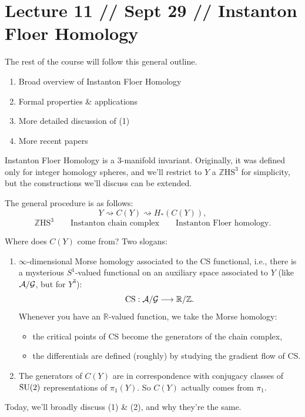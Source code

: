 \documentclass[main]{subfiles}
\begin{document}
\section*{Lecture 11 // Sept 29 // Instanton Floer Homology}

The rest of the course will follow this general outline.
\begin{enumerate}
\item Broad overview of Instanton Floer Homology
\item Formal properties \& applications
\item More detailed discussion of (1)
\item More recent papers
\end{enumerate}

Instanton Floer Homology is a $3$-manifold invariant. Originally, it was defined only for integer homology spheres, and we'll restrict to $Y$ a $\mathbb{Z}\mathrm{HS}^3$ for simplicity, but the constructions we'll discuss can be extended.

The general procedure is as follows:
\[
Y \rightsquigarrow C(Y) \rightsquigarrow H_\ast(C(Y)),
\]
\[
\mathbb{Z}\mathrm{HS}^3 \qquad \text{Instanton chain complex} \qquad \text{Instanton Floer homology}.
\]

Where does $C(Y)$ come from? Two slogans:
\begin{enumerate}
\item $\infty$-dimensional Morse homology associated to the CS functional, i.e., there is a mysterious $S^1$-valued functional on an auxiliary space associated to $Y$ (like $\mathcal{A}/\mathcal{G}$, but for $Y^3$):
\[
\operatorname{CS} : \mathcal{A}/\mathcal{G} \longrightarrow \mathbb{R}/\mathbb{Z}.
\]
Whenever you have an $\mathbb{R}$-valued function, we take the Morse homology:
\begin{itemize}
\item the critical points of CS become the generators of the chain complex,
\item the differentials are defined (roughly) by studying the gradient flow of CS.
\end{itemize}
\item The generators of $C(Y)$ are in correspondence with conjugacy classes of $\operatorname{SU}(2)$ representations of $\pi_1(Y)$. So $C(Y)$ actually comes from $\pi_1$.
\end{enumerate}

Today, we'll broadly discuss (1) \& (2), and why they're the same.
\end{document}
